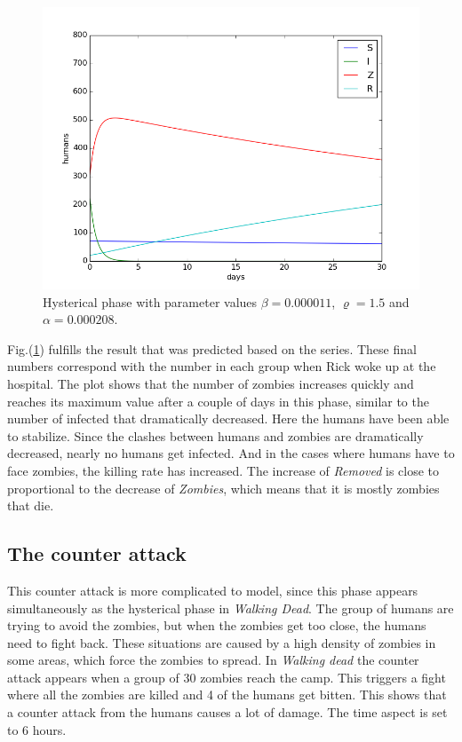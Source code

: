 \documentclass[%
twoside,                 %
final,                   %
chapterprefix=true,      %
open=right               %
10pt]{book}
\begin{document}
\begin{figure}[ht]
  \centerline{\includegraphics[width=0.9\linewidth]{1_fig/WD_zombie_hysterical_1.png}}
  \caption{
  \label{fig:hysterical_1} Hysterical phase with parameter values $\beta = 0.000011$, $\varrho = 1.5$ and $\alpha = 0.000208$.
  }
\end{figure}


Fig.(\ref{fig:hysterical_1}) fulfills the result that was predicted based on the series. These final numbers correspond with the number in each group when Rick woke up at the hospital. The plot shows that the number of zombies increases quickly and reaches its maximum value after a couple of days in this phase, similar to the number of infected that dramatically decreased. Here the humans have been able to stabilize. Since the clashes between humans and zombies are dramatically decreased, nearly no humans get infected. And in the cases where humans have to face zombies, the killing rate has increased. The increase of \emph{Removed} is close to proportional to the decrease of \emph{Zombies}, which means that it is mostly zombies that die.

\subsection{The counter attack}
\label{section:counter_attack}
This counter attack is more complicated to model, since this phase appears simultaneously as the hysterical phase in \emph{Walking Dead}. The group of humans are trying to avoid the zombies, but when the zombies get too close, the humans need to fight back. These situations are caused by a high density of zombies in some areas, which force the zombies to spread. In \emph{Walking dead} the counter attack appears when a group of 30 zombies reach the camp. This triggers a fight where all the zombies are killed and 4 of the humans get bitten. This shows that a counter attack from the humans causes a lot of damage. The time aspect is set to 6 hours.  
\end{document}
